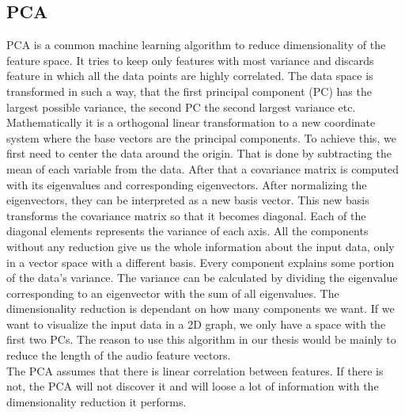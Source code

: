 \subsection{PCA}

PCA is a common machine learning algorithm to reduce dimensionality of the feature space. It tries to keep only features with most variance and discards feature in which all the data points are highly correlated. The data space is transformed in such a way, that the first principal component (PC) has the largest possible variance, the second PC the second largest variance etc. \\
Mathematically it is a orthogonal linear transformation to a new coordinate system where the base vectors are the principal components. To achieve this, we first need to center the data around the origin. That is done by subtracting the mean of each variable from the data. After that a covariance matrix is computed with its eigenvalues and corresponding eigenvectors. After normalizing the eigenvectors, they can be interpreted as a new basis vector. This new basis transforms the covariance matrix so that it becomes diagonal. Each of the diagonal elements represents the variance of each axis. All the components without any reduction give us the whole information about the input data, only in a vector space with a different basis. Every component explains some portion of the data's variance. The variance can be calculated by dividing the eigenvalue corresponding to an eigenvector with the sum of all eigenvalues. The dimensionality reduction is dependant on how many components we want. If we want to visualize the input data in a 2D graph, we only have a space with the first two PCs. The reason to use this algorithm in our thesis would be mainly to reduce the length of the audio feature vectors. \\
The PCA assumes that there is linear correlation between features. If there is not, the PCA will not discover it and will loose a lot of information with the dimensionality reduction it performs.

